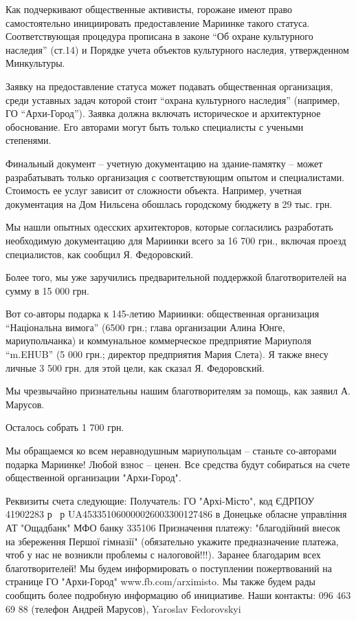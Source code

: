 Как подчеркивают общественные активисты, горожане имеют право самостоятельно
инициировать предоставление Мариинке такого статуса. Соответствующая процедура
прописана в законе \enquote{Об охране культурного наследия} (ст.14) и Порядке учета
объектов культурного наследия, утвержденном Минкультуры.

Заявку на предоставление статуса может подавать общественная организация, среди
уставных задач которой стоит \enquote{охрана культурного наследия} (например,
ГО \enquote{Архи-Город}). Заявка должна включать историческое и архитектурное
обоснование.  Его авторами могут быть только специалисты с учеными степенями.

Финальный документ – учетную документацию на здание-памятку – может
разрабатывать только организация с соответствующим опытом и специалистами.
Стоимость ее услуг зависит от сложности объекта. Например, учетная документация
на Дом Нильсена обошлась городскому бюджету в 29 тыс. грн.

Мы нашли опытных одесских архитекторов, которые согласились разработать
необходимую документацию для Мариинки всего за 16 700 грн., включая проезд
специалистов, как сообщил Я. Федоровский. 

Более того, мы уже заручились предварительной поддержкой благотворителей на сумму в 15 000 грн.

Вот со-авторы подарка к 145-летию Мариинки: общественная организация
\enquote{Національна вимога} (6500 грн.; глава организации Алина Юнге, мариупольчанка)
и коммунальное коммерческое предприятие Мариуполя \enquote{m.EHUB} (5 000 грн.;
директор предприятия Мария Слета). Я также внесу личные 3 500 грн. для этой
цели, как сказал Я. Федоровский.

Мы чрезвычайно признательны нашим благотворителям за помощь, как заявил А. Марусов.

Осталось собрать 1 700 грн.

Мы обращаемся ко всем неравнодушным мариупольцам – станьте со-авторами подарка
Мариинке! Любой взнос – ценен. Все средства будут собираться на счете
общественной организации "Архи-Город".

Реквизиты счета следующие: 
Получатель: ГО "Архі-Місто", код ЄДРПОУ 41902283
р \ р UA453351060000026003300127486 
в Донецьке обласне управління АТ "Ощадбанк"
МФО банку 335106
Призначення платежу: "благодійний внесок на збереження Першої гімназії" (обязательно укажите предназначение платежа, чтоб у нас не возникли проблемы с налоговой!!!).
Заранее благодарим всех благотворителей!
Мы будем информировать о поступлении пожертвований на странице ГО "Архи-Город" www.fb.com/arximisto.
Мы также будем рады сообщить более подробную информацию об инициативе. Наши контакты: 096 463 69 88 (телефон Андрей Марусов), Yaroslav Fedorovskyi 

